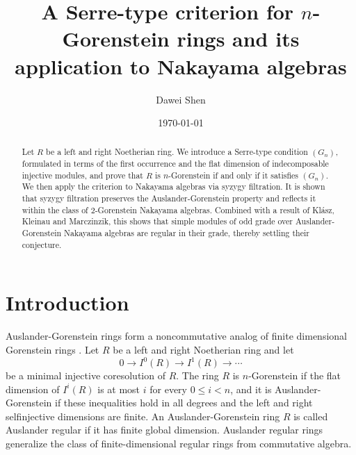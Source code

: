 \documentclass[a4paper,reqno]{amsart}
\numberwithin{equation}{section}
\theoremstyle{plain}
\theoremstyle{definition}
\theoremstyle{remark}
\renewcommand{\-}{\mbox{-}}
\begin{document}
\title[A Serre-type criterion for \(n\)-Gorenstein rings]
{A Serre-type criterion for \(n\)-Gorenstein rings and its application  to Nakayama algebras}

\author{Dawei Shen}
\address{School of mathematics and statistics \\
         Henan University \\
         Kaifeng, Henan 475004 \\
         P. R. China}
\date{\today}
\begin{abstract}
Let \(R\) be a left and right Noetherian ring.
We introduce a Serre-type condition \((G_n)\), 
formulated in terms of the first occurrence and 
the flat dimension of indecomposable injective modules,
and prove that \(R\) is \(n\)-Gorenstein if and only if it satisfies \((G_n)\).
We then apply the criterion to Nakayama algebras via syzygy filtration.
It is shown that syzygy filtration preserves the Auslander-Gorenstein property 
and reflects it within the class of
\(2\)-Gorenstein Nakayama algebras.
Combined with a result of Kl\'asz, Kleinau and Marczinzik, 
this shows that simple modules of odd grade over Auslander-Gorenstein Nakayama algebras 
are regular in their grade, 
thereby settling their conjecture.
\end{abstract}

\maketitle

\section{Introduction}
Auslander-Gorenstein rings form a noncommutative analog of 
finite dimensional Gorenstein rings \cite{FGR75}.
Let \(R\) be a left and right Noetherian ring
and let
\[
  0\longrightarrow I^0(R)\longrightarrow I^1(R)
  \longrightarrow\cdots
\]
be a minimal injective coresolution of \(R\). 
The ring \(R\) is \(n\)-Gorenstein if
the flat dimension of  \(I^i(R)\) is at most \(i\) for every \(0\leq i<n\), and it is
Auslander-Gorenstein if these inequalities hold in all degrees and the left
and right selfinjective dimensions are finite.
An Auslander-Gorenstein ring \(R\) is called Auslander regular if it has finite global dimension.
Auslander regular rings generalize the class of finite-dimensional regular rings 
from commutative algebra.
\end{document}
